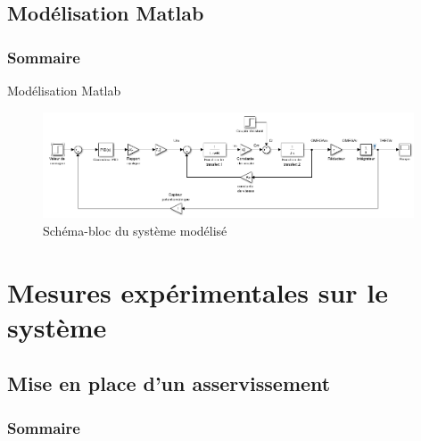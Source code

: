 \documentclass[french, handout]{beamer}
\begin{document}
    \subsection{Modélisation Matlab}
    
    \begin{frame}
    \frametitle{Sommaire}
    \tableofcontents[sections=3, currentsubsection]
    \end{frame} 
    
    \begin{frame}{Modélisation Matlab}
        \begin{figure}
            \centering
            \includegraphics[width=11cm]{schema_bloc.png}
            \caption{Schéma-bloc du système modélisé}
        \end{figure}
    \end{frame}

    \section{Mesures expérimentales sur le système}

        \subsection{Mise en place d'un asservissement}
        
        \begin{frame}
        \frametitle{Sommaire}
        \tableofcontents[sections=4, currentsubsection]
        \end{frame}
        
\end{document}
